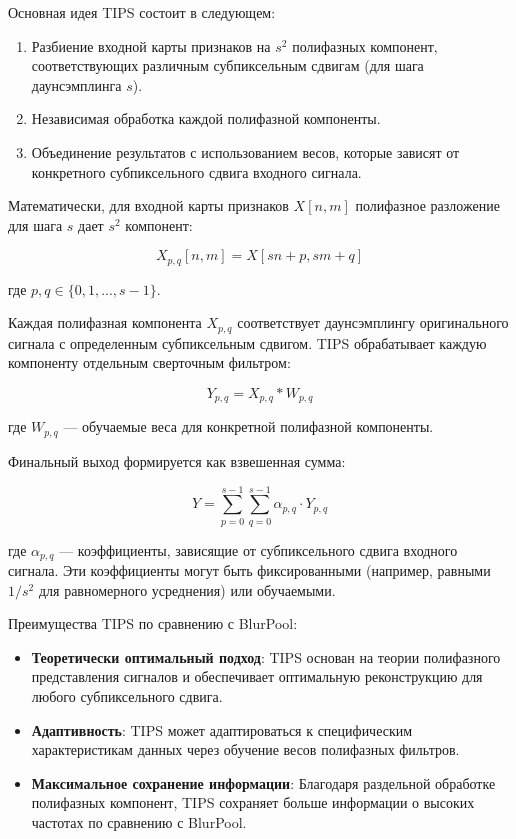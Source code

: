 Основная идея TIPS состоит в следующем:

\begin{enumerate}
    \item Разбиение входной карты признаков на $s^2$ полифазных компонент, соответствующих различным субпиксельным сдвигам (для шага даунсэмплинга $s$).
    \item Независимая обработка каждой полифазной компоненты.
    \item Объединение результатов с использованием весов, которые зависят от конкретного субпиксельного сдвига входного сигнала.
\end{enumerate}

Математически, для входной карты признаков $X[n,m]$ полифазное разложение для шага $s$ дает $s^2$ компонент:

\begin{equation}
X_{p,q}[n,m] = X[sn+p, sm+q]
\end{equation}

где $p, q \in \{0, 1, ..., s-1\}$.

Каждая полифазная компонента $X_{p,q}$ соответствует даунсэмплингу оригинального сигнала с определенным субпиксельным сдвигом. TIPS обрабатывает каждую компоненту отдельным сверточным фильтром:

\begin{equation}
Y_{p,q} = X_{p,q} * W_{p,q}
\end{equation}

где $W_{p,q}$ — обучаемые веса для конкретной полифазной компоненты.

Финальный выход формируется как взвешенная сумма:

\begin{equation}
Y = \sum_{p=0}^{s-1} \sum_{q=0}^{s-1} \alpha_{p,q} \cdot Y_{p,q}
\end{equation}

где $\alpha_{p,q}$ — коэффициенты, зависящие от субпиксельного сдвига входного сигнала. Эти коэффициенты могут быть фиксированными (например, равными $1/s^2$ для равномерного усреднения) или обучаемыми.

Преимущества TIPS по сравнению с BlurPool:

\begin{itemize}
    \item \textbf{Теоретически оптимальный подход}: TIPS основан на теории полифазного представления сигналов и обеспечивает оптимальную реконструкцию для любого субпиксельного сдвига.
    
    \item \textbf{Адаптивность}: TIPS может адаптироваться к специфическим характеристикам данных через обучение весов полифазных фильтров.
    
    \item \textbf{Максимальное сохранение информации}: Благодаря раздельной обработке полифазных компонент, TIPS сохраняет больше информации о высоких частотах по сравнению с BlurPool.
\end{itemize}

